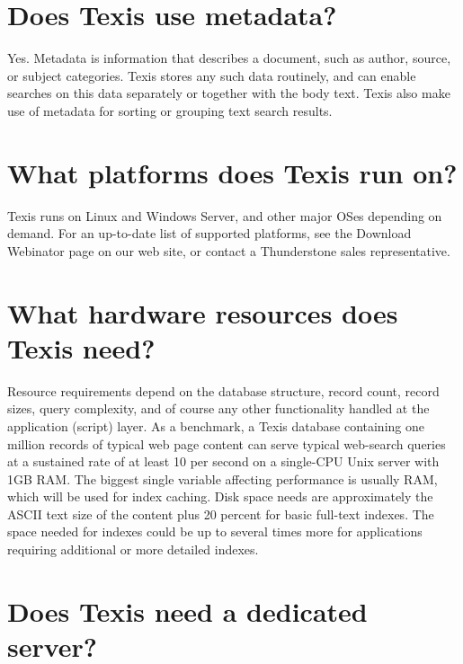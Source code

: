 \section{Does Texis use metadata? }

Yes. Metadata is information that describes a document, such as
author, source, or subject categories. Texis stores any such data
routinely, and can enable searches on this data separately or together
with the body text. Texis also make use of metadata for sorting or
grouping text search results.

\section{What platforms does Texis run on? }

Texis runs on Linux and Windows Server, and other major OSes depending
on demand.  For an up-to-date list of supported platforms, see the
Download Webinator page on our web site, or contact a Thunderstone
sales representative.

\section{What hardware resources does Texis need? }

Resource requirements depend on the database structure, record count,
record sizes, query complexity, and of course any other functionality
handled at the application (script) layer. As a benchmark, a Texis
database containing one million records of typical web page content
can serve typical web-search queries at a sustained rate of at least
10 per second on a single-CPU Unix server with 1GB RAM.  The biggest
single variable affecting performance is usually RAM, which will be
used for index caching.  Disk space needs are approximately the ASCII
text size of the content plus 20 percent for basic full-text
indexes. The space needed for indexes could be up to several times
more for applications requiring additional or more detailed indexes.

\section{Does Texis need a dedicated server? }

